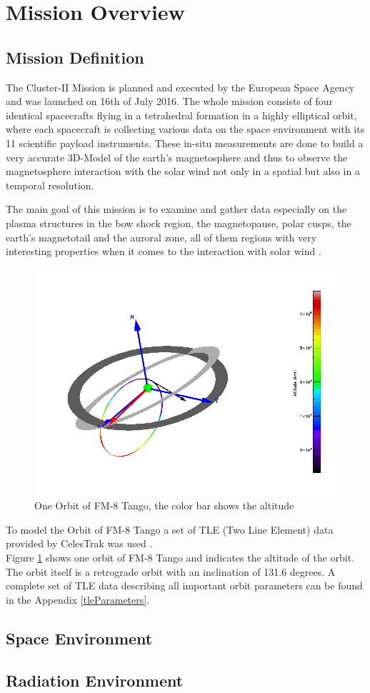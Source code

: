 \section{Mission Overview}

\subsection{Mission Definition}
The Cluster-II Mission is planned and executed by the European Space Agency and was launched on 16th of July 2016. The whole mission consists of four identical spacecrafts flying in a tetrahedral formation in a highly elliptical orbit, where each spacecraft is collecting various data on the space environment with its 11 scientific payload instruments. These in-situ measurements are done to build a very accurate 3D-Model of the earth's magnetosphere and thus to observe the magnetosphere interaction with the solar wind not only in a spatial but also in a temporal resolution.

The main goal of this mission is to examine and gather data especially on the plasma structures in the bow shock region, the magnetopause, polar cusps, the earth's magnetotail and the auroral zone, all of them regions with very interesting properties when it comes to the interaction with solar wind \citep{ESA:clusterWebsite}.

\begin{figure}[h]
	\centering
	\includegraphics[width=\linewidth]{spenvis/3d_gei}
		\caption{One Orbit of FM-8 Tango, the color bar shows the altitude}
	\label{fig:orbit}
\end{figure}
To model the Orbit of FM-8 Tango a set of TLE (Two Line Element) data provided by CelesTrak was used \citep{celesTrak}.\\
Figure \ref{fig:orbit} shows one orbit of FM-8 Tango and indicates the altitude of the orbit. The orbit itself is a retrograde orbit with an inclination of 131.6 degrees. A complete set of TLE data describing all important orbit parameters can be found in the Appendix \ref{tleParameters}.




\subsection{Space Environment}

\subsection{Radiation Environment}

